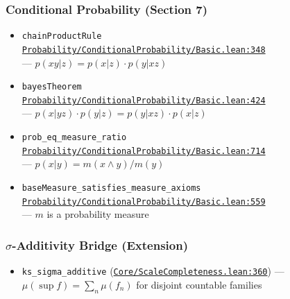 \documentclass[11pt]{article}
\theoremstyle{definition}
\theoremstyle{remark}
\begin{document}
\subsubsection*{Conditional Probability (Section 7)}
\begin{itemize}
\item \texttt{chainProductRule}\\
      \href{https://github.com/zariuq/ks-foundations-of-inference/blob/main/KnuthSkilling/Probability/ConditionalProbability/Basic.lean\#L348}{\texttt{Probability/ConditionalProbability/Basic.lean:348}}\\
      --- $p(xy|z) = p(x|z) \cdot p(y|xz)$
\item \texttt{bayesTheorem}\\
      \href{https://github.com/zariuq/ks-foundations-of-inference/blob/main/KnuthSkilling/Probability/ConditionalProbability/Basic.lean\#L424}{\texttt{Probability/ConditionalProbability/Basic.lean:424}}\\
      --- $p(x|yz) \cdot p(y|z) = p(y|xz) \cdot p(x|z)$
\item \texttt{prob\_eq\_measure\_ratio}\\
      \href{https://github.com/zariuq/ks-foundations-of-inference/blob/main/KnuthSkilling/Probability/ConditionalProbability/Basic.lean\#L714}{\texttt{Probability/ConditionalProbability/Basic.lean:714}}\\
      --- $p(x|y) = m(x \wedge y) / m(y)$
\item \texttt{baseMeasure\_satisfies\_measure\_axioms}\\
      \href{https://github.com/zariuq/ks-foundations-of-inference/blob/main/KnuthSkilling/Probability/ConditionalProbability/Basic.lean\#L559}{\texttt{Probability/ConditionalProbability/Basic.lean:559}}\\
      --- $m$ is a probability measure
\end{itemize}

\subsubsection*{$\sigma$-Additivity Bridge (Extension)}
\begin{itemize}
\item \texttt{ks\_sigma\_additive} (\href{https://github.com/zariuq/ks-foundations-of-inference/blob/main/KnuthSkilling/Core/ScaleCompleteness.lean\#L360}{\texttt{Core/ScaleCompleteness.lean:360}}) --- $\mu(\sup f)=\sum_n \mu(f_n)$ for disjoint countable families
\end{itemize}
\end{document}
